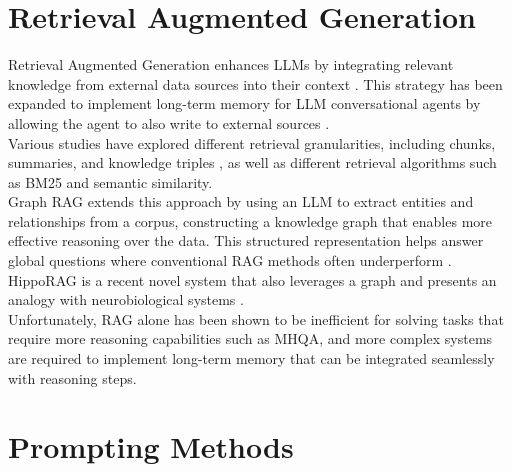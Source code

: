 \section{Retrieval Augmented Generation}

Retrieval Augmented Generation enhances LLMs by integrating relevant knowledge from external data sources into their context \cite{lewis2021retrievalaugmentedgenerationknowledgeintensivenlp}. This strategy has been expanded to implement long-term memory for LLM conversational agents by allowing the agent to also write to external sources \cite{Zhong_Guo_Gao_Ye_Wang_2024}. \\ 

\noindent Various studies have explored different retrieval granularities, including chunks, summaries, and knowledge triples \cite{zeng2024structuralmemoryllmagents}, as well as different retrieval algorithms such as BM25 and semantic similarity.\\

\noindent Graph RAG extends this approach by using an LLM to extract entities and relationships from a corpus, constructing a knowledge graph that enables more effective reasoning over the data. This structured representation helps answer global questions where conventional RAG methods often underperform \cite{edge2024localglobalgraphrag}. HippoRAG is a recent novel system that also leverages a graph and presents an analogy with neurobiological systems \cite{NEURIPS2024_6ddc001d}.\\

\noindent Unfortunately, RAG alone has been shown to be inefficient for solving tasks that require more reasoning capabilities such as MHQA, and more complex systems are required to implement long-term memory that can be integrated seamlessly with reasoning steps.

\section{Prompting Methods}

